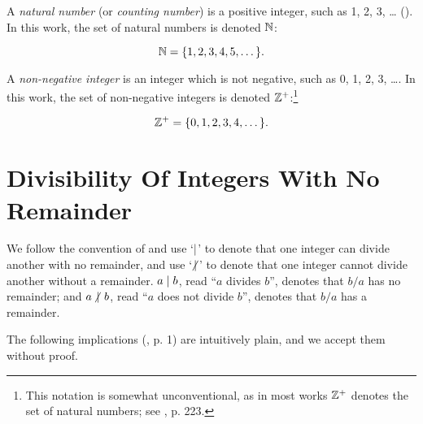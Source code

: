 A \emph{natural number}
 (or \emph{counting number})
is a positive integer,
such as 1, 2, 3, \ldots{} (\cite{bibref:b:penguindictionaryofmathematics:2ded}).
In this work, the set of natural numbers is denoted
${\mathbb{N}}$:

\begin{equation}
{\mathbb{N}} = \{ 1, 2, 3, 4, 5, \ldots{} \}.
\end{equation}

A \emph{non-negative integer}
is an integer which is not negative,
such as 0, 1, 2, 3, \ldots{}.  In this work, the set of non-negative
integers is denoted ${\mathbb{Z}^+}$:\footnote{This notation is
somewhat unconventional, as in most works ${\mathbb{Z}^+}$ denotes
the set of natural numbers; see \cite{bibref:b:penguindictionaryofmathematics:2ded},
p. 223.}

\begin{equation}
{\mathbb{Z}^+} = \{ 0, 1, 2, 3, 4, \ldots{} \}.
\end{equation}

\section{Divisibility Of Integers With No Remainder}
\label{cpri0:doi0}

We follow the convention of \cite{bibref:b:HardyAndWrightClassic}
and use `$\mid$'
to denote that one integer can divide
another with no remainder, and use `$\hspace{-0.125em}\not\hspace{0.245em}\mid\hspace{0.135em}$' 
to denote
that one integer cannot divide another without a
remainder.  $a \mid b$, read ``$a$
divides $b$'', denotes that $b/a$ has no remainder; and
$a \hspace{-0.125em}\not\hspace{0.245em}\mid\hspace{0.135em} b$, read ``$a$ does not divide $b$'', denotes
that $b/a$ has a remainder.

The following implications (\cite{bibref:b:HardyAndWrightClassic}, p. 1)
are intuitively plain, and we accept them without proof.

